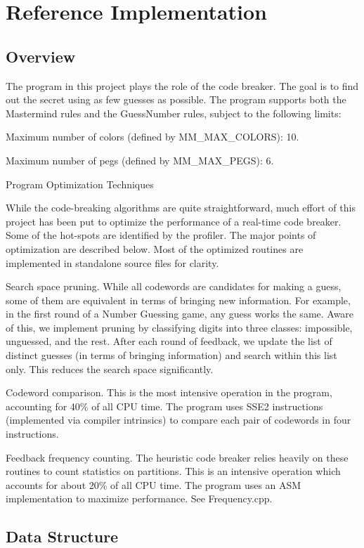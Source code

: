 \chapter{Reference Implementation}

\section{Overview}

The program in this project plays the role of the code breaker. The goal is to find out the secret using as few guesses as possible. The program supports both the Mastermind rules and the GuessNumber rules, subject to the following limits:

Maximum number of colors (defined by MM\_MAX\_COLORS): 10.

Maximum number of pegs (defined by MM\_MAX\_PEGS): 6.

Program Optimization Techniques

While the code-breaking algorithms are quite straightforward, much effort of this project has been put to optimize the performance of a real-time code breaker. Some of the hot-spots are identified by the profiler. The major points of optimization are described below. Most of the optimized routines are implemented in standalone source files for clarity.

Search space pruning. While all codewords are candidates for making a guess, some of them are equivalent in terms of bringing new information. For example, in the first round of a Number Guessing game, any guess works the same. Aware of this, we implement pruning by classifying digits into three classes: impossible, unguessed, and the rest. After each round of feedback, we update the list of distinct guesses (in terms of bringing information) and search within this list only. This reduces the search space significantly.

Codeword comparison. This is the most intensive operation in the program, accounting for 40\% of all CPU time. The program uses SSE2 instructions (implemented via compiler intrinsics) to compare each pair of codewords in four instructions.

Feedback frequency counting. The heuristic code breaker relies heavily on these routines to count statistics on partitions. This is an intensive operation which accounts for about 20\% of all CPU time. The program uses an ASM implementation to maximize performance. See Frequency.cpp.

\section{Data Structure}

